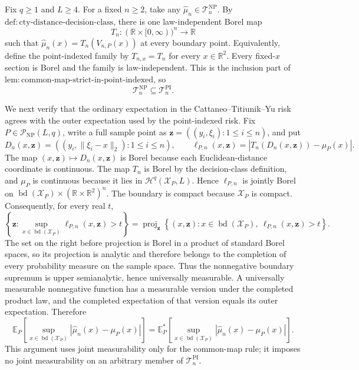Fix \(q\geq1\) and \(L\geq4\).  For a fixed \(n\geq2\), take any \(\widehat\mu_n\in\mathcal T_n^{\mathrm{NP}}\).  By \(\mathrm{def:cty\text{-}distance\text{-}decision\text{-}class}\), there is one law-independent Borel map
\[
 T_n:(\mathbb R\times[0,\infty))^n\longrightarrow\mathbb R
\]
such that \(\widehat\mu_n(x)=T_n(V_{n,P}(x))\) at every boundary point.  Equivalently, define the point-indexed family by \(T_{n,x}=T_n\) for every \(x\in\mathbb R^2\).  Every fixed-\(x\) section is Borel and the family is law-independent.  This is the inclusion part of \(\mathrm{lem:common\text{-}map\text{-}strict\text{-}in\text{-}point\text{-}indexed}\), so
\[
 \mathcal T_n^{\mathrm{NP}}\subseteq\mathcal T_n^{\mathrm{PI}}.
\]

We next verify that the ordinary expectation in the Cattaneo--Titiunik--Yu risk agrees with the outer expectation used by the point-indexed risk.  Fix \(P\in\mathcal P_{\mathrm{NP}}(L,q)\), write a full sample point as \(\mathbf z=((y_i,\xi_i):1\leq i\leq n)\), and put
\[
 D_n(x,\mathbf z)=((y_i,\lVert\xi_i-x\rVert_2):1\leq i\leq n),
 \qquad
 \ell_{P,n}(x,\mathbf z)
 =\left|T_n(D_n(x,\mathbf z))-\mu_P(x)\right|.
\]
The map \((x,\mathbf z)\mapsto D_n(x,\mathbf z)\) is Borel because each Euclidean-distance coordinate is continuous.  The map \(T_n\) is Borel by the decision-class definition, and \(\mu_P\) is continuous because it lies in \(\mathcal H^q(\mathcal X_P,L)\).  Hence \(\ell_{P,n}\) is jointly Borel on \(\operatorname{bd}(\mathcal X_P)\times(\mathbb R\times\mathbb R^2)^n\).  The boundary is compact because \(\mathcal X_P\) is compact.  Consequently, for every real \(t\),
\[
 \left\{\mathbf z:
   \sup_{x\in\operatorname{bd}(\mathcal X_P)}
   \ell_{P,n}(x,\mathbf z)>t
 \right\}
 =\operatorname{proj}_{\mathbf z}
 \left\{(x,\mathbf z):
   x\in\operatorname{bd}(\mathcal X_P),\ 
   \ell_{P,n}(x,\mathbf z)>t
 \right\}.
\]
The set on the right before projection is Borel in a product of standard Borel spaces, so its projection is analytic and therefore belongs to the completion of every probability measure on the sample space.  Thus the nonnegative boundary supremum is upper semianalytic, hence universally measurable.  A universally measurable nonnegative function has a measurable version under the completed product law, and the completed expectation of that version equals its outer expectation.  Therefore
\[
 \mathbb E_P\!\left[
   \sup_{x\in\operatorname{bd}(\mathcal X_P)}
   |\widehat\mu_n(x)-\mu_P(x)|
 \right]
 =
 \mathbb E_P^*\!\left[
   \sup_{x\in\operatorname{bd}(\mathcal X_P)}
   |\widehat\mu_n(x)-\mu_P(x)|
 \right].
\]
This argument uses joint measurability only for the common-map rule; it imposes no joint measurability on an arbitrary member of \(\mathcal T_n^{\mathrm{PI}}\).

